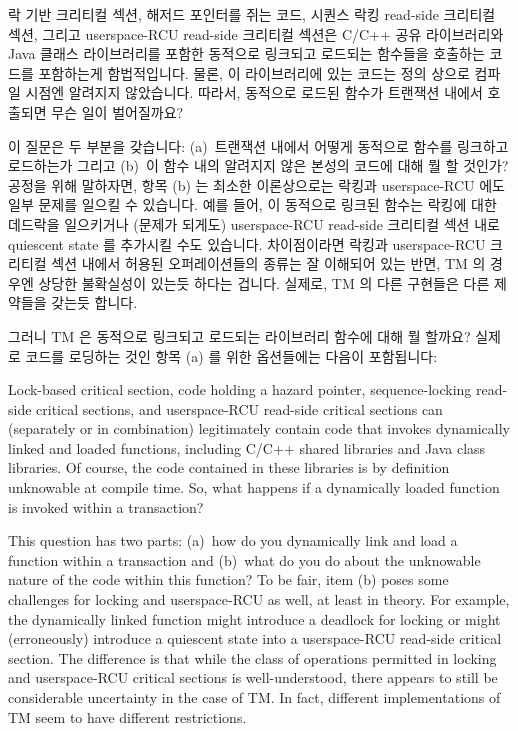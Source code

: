 락 기반 크리티컬 섹션, 해저드 포인터를 쥐는 코드, 시퀀스 락킹 read-side
크리티컬 섹션, 그리고 userspace-RCU read-side 크리티컬 섹션은 C/C++ 공유
라이브러리와 Java 클래스 라이브러리를 포함한 동적으로 링크되고 로드되는
함수들을 호출하는 코드를 포함하는게 함법적입니다.
물론, 이 라이브러리에 있는 코드는 정의 상으로 컴파일 시점엔 알려지지
않았습니다.
따라서, 동적으로 로드된 함수가 트랜잭션 내에서 호출되면 무슨 일이 벌어질까요?

이 질문은 두 부분을 갖습니다: (a)~트랜잭션 내에서 어떻게 동적으로 함수를
링크하고 로드하는가 그리고 (b)~이 함수 내의 알려지지 않은 본성의 코드에 대해 뭘
할 것인가?
공정을 위해 말하자면, 항목 (b) 는 최소한 이론상으로는 락킹과 userspace-RCU 에도
일부 문제를 일으킬 수 있습니다.
예를 들어, 이 동적으로 링크된 함수는 락킹에 대한 데드락을 일으키거나 (문제가
되게도) userspace-RCU read-side 크리티컬 섹션 내로 quiescent state 를 추가시킬
수도 있습니다.
차이점이라면 락킹과 userspace-RCU 크리티컬 섹션 내에서 허용된 오퍼레이션들의
종류는 잘 이해되어 있는 반면, TM 의 경우엔 상당한 불확실성이 있는듯 하다는
겁니다.
실제로, TM 의 다른 구현들은 다른 제약들을 갖는듯 합니다.

그러니 TM 은 동적으로 링크되고 로드되는 라이브러리 함수에 대해 뭘 할까요?
실제로 코드를 로딩하는 것인 항목 (a) 를 위한 옵션들에는 다음이 포함됩니다:

\iffalse

Lock-based critical section, code holding a hazard pointer,
sequence-locking read-side critical sections, and userspace-RCU read-side
critical sections can (separately or in combination) legitimately contain
code that invokes dynamically linked and loaded functions, including C/C++
shared libraries and Java class libraries.
Of course, the code contained in these libraries is by definition
unknowable at compile time.
So, what happens if a dynamically loaded function is invoked within
a transaction?

This question has two parts: (a)~how do you dynamically link and load a
function within a transaction and (b)~what do you do about the unknowable
nature of the code within this function?
To be fair, item (b) poses some challenges for locking and userspace-RCU
as well, at least in theory.
For example, the dynamically linked function might introduce a deadlock
for locking or might (erroneously) introduce a quiescent state into a
userspace-RCU read-side critical section.
The difference is that while the class of operations permitted in locking
and userspace-RCU critical sections is well-understood, there appears
to still be considerable uncertainty in the case of TM\@.
In fact, different implementations of TM seem to have different restrictions.

